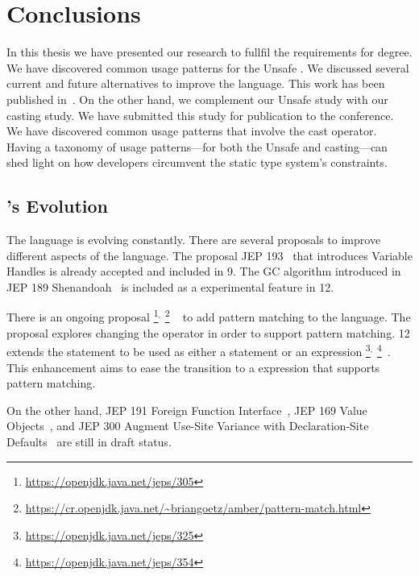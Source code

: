 \chapter{Conclusions}
\label{cha:conclusions}

In this thesis we have presented our research to fullfil the requirements for \phd{} degree.
We have discovered common usage patterns for the \java{} Unsafe \api{}.
We discussed several current and future alternatives to improve the
\java{} language.
This work has been published in~\citep{mastrangeloUseYourOwn2015}.
On the other hand, we complement our Unsafe \api{} study with 
our casting study.
We have submitted this study for publication to the  conference.
We have discovered common usage patterns that involve the cast operator.
Having a taxonomy of usage patterns---for both the Unsafe \api{} and casting---can shed light on how \java{} developers circumvent the static type system's constraints.

\section{\java{}'s Evolution}

The \java{} language is evolving constantly.
There are several proposals to improve different aspects of the language.
The proposal JEP 193~\citep{jep193} that introduces Variable Handles is already accepted and included in \java{} 9.
The GC algorithm introduced in JEP 189 Shenandoah~\citep{jep189} is included as a experimental feature in \java{} 12.

There is an ongoing proposal%
\footnote{\url{https://openjdk.java.net/jeps/305}}$^{,}$%
\footnote{\url{https://cr.openjdk.java.net/~briangoetz/amber/pattern-match.html}}%
~\citep{jep305} to add pattern matching to the \java{} language.
The proposal explores changing the  operator in order to support pattern matching.
\java{} 12 extends the  statement to be used as either a statement or an expression%
\footnote{\url{https://openjdk.java.net/jeps/325}}$^{,}$%
\footnote{\url{https://openjdk.java.net/jeps/354}}~\citep{jep325,jep354}.
This enhancement aims to ease the transition to a  expression that supports pattern matching.

On the other hand,
JEP 191 Foreign Function Interface~\citep{jep191},
JEP 169 Value Objects~\citep{jep169}, and
JEP 300 Augment Use-Site Variance with Declaration-Site Defaults~\citep{jep300}
are still in draft status.

